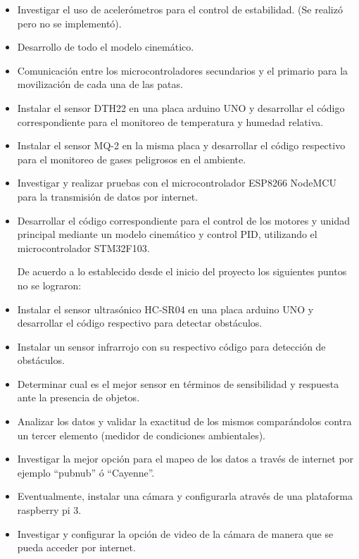 \documentclass[12pt,letterpaper]{IEEEtran}
\begin{document}
\begin{itemize}
  \item Investigar el uso de acelerómetros para el control de estabilidad. (Se realizó pero no se implementó).
  \item Desarrollo de todo el modelo cinemático.
  \item Comunicación entre los microcontroladores secundarios y el primario para la movilización de cada una de las patas.
  \item Instalar el sensor DTH22 en una placa arduino UNO y desarrollar el código correspondiente para el monitoreo de temperatura y humedad relativa.
  \item Instalar el sensor MQ-2 en la misma placa y desarrollar el código respectivo para el monitoreo de gases peligrosos en el ambiente.
  \item Investigar y realizar pruebas con el microcontrolador ESP8266 NodeMCU para la transmisión de datos por internet.
  \item Desarrollar el código correspondiente para el control de los motores y unidad principal mediante un modelo cinemático y control PID, utilizando el microcontrolador STM32F103.




De acuerdo a lo establecido desde el inicio del proyecto los siguientes puntos no se lograron:



  \item Instalar el sensor ultrasónico HC-SR04 en una placa arduino UNO y desarrollar el código respectivo para detectar obstáculos.
  \item Instalar un sensor infrarrojo con su respectivo código para detección de obstáculos.
  \item  Determinar cual es el mejor sensor en términos de sensibilidad y respuesta ante la presencia de objetos.
  \item  Analizar los datos y validar la exactitud de los mismos comparándolos contra un tercer elemento (medidor de condiciones ambientales).
  \item Investigar la mejor opción para el mapeo de los datos a través de internet por ejemplo ``pubnub'' ó ``Cayenne''.
  \item Eventualmente, instalar una cámara y configurarla através de una plataforma raspberry pi 3.
  \item Investigar y configurar la opción de video de la cámara de manera que se pueda acceder por internet.
  
   
 
   
\end{itemize}
\end{document}
